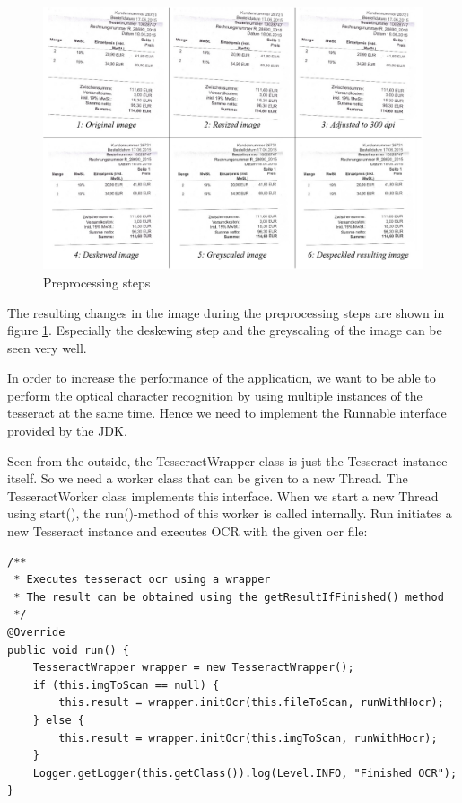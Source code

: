 \begin{figure}[htb!]
\centering
\includegraphics[width=\textwidth]{Images/OCR/PreprocessingSteps.jpg}
\caption{Preprocessing steps \label{preprocessingSteps}}
\end{figure}

The resulting changes in the image during the preprocessing steps are shown in figure \ref{preprocessingSteps}.
Especially the deskewing step and the greyscaling of the image can be seen very well.

In order to increase the performance of the application, we want to be able to perform the optical character recognition by using multiple instances of the tesseract at the same time. Hence we need to implement the Runnable interface provided by the JDK. 

Seen from the outside, the TesseractWrapper class is just the Tesseract instance itself. So we need a worker class that can be given to a new Thread. The TesseractWorker class implements this interface. When we start a new Thread using start(), the run()-method of this worker is called internally. Run initiates a new Tesseract instance and executes OCR with the given ocr file: 

\begin{lstlisting}[caption={Initiation of the OCR wrapper}]
/**
 * Executes tesseract ocr using a wrapper
 * The result can be obtained using the getResultIfFinished() method
 */
@Override
public void run() {
    TesseractWrapper wrapper = new TesseractWrapper();
    if (this.imgToScan == null) {
        this.result = wrapper.initOcr(this.fileToScan, runWithHocr);
    } else {
        this.result = wrapper.initOcr(this.imgToScan, runWithHocr);
    }
    Logger.getLogger(this.getClass()).log(Level.INFO, "Finished OCR");
}
\end{lstlisting}

